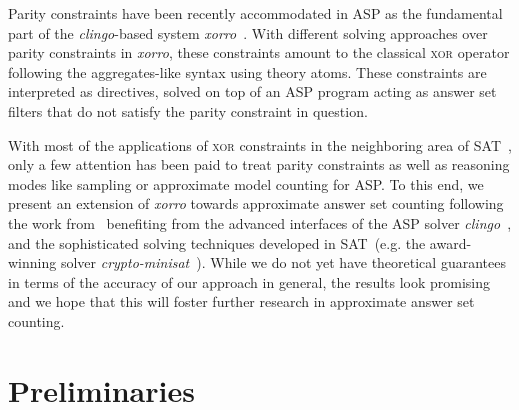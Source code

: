 \documentclass{svproc}
\newcommand{\XOR}{\textsc{xor}} %
\newcommand{\sysfont}{\textit}
\newcommand{\clingo}{\sysfont{clingo}}
\newcommand{\xorro}{\sysfont{xorro}}
\newcommand{\cryptominisat}{\sysfont{crypto-minisat}}
\begin{document}
Parity constraints have been recently accommodated in ASP
as the fundamental part of the \clingo{}-based system \xorro{}~\cite{DBLP:conf/lpnmr/EverardoJKS19}.
%
With different solving approaches over parity constraints in \xorro{}, these constraints amount to the classical \XOR{} operator following the aggregates-like syntax using theory atoms.
These constraints are interpreted as directives, solved on top of an ASP program acting as answer set filters that do not satisfy the parity constraint in question.
%



%
With most of the applications of \XOR{} constraints in the neighboring area of SAT~\cite{DBLP:journals/corr/abs-1806-02239},
only a few attention has been paid to treat parity constraints as well as reasoning modes like sampling or approximate model counting for ASP. %
%
To this end, we present an extension of \xorro{} towards approximate answer set counting following the work from~\cite{ChakrabortyMV13}
benefiting from the advanced interfaces of the ASP solver \clingo{}~\cite{DBLP:conf/iclp/GebserKKOSW16},
and the sophisticated solving techniques developed in SAT~(e.g. the award-winning solver \cryptominisat~\cite{DBLP:conf/sat/SoosNC09}).
%
While we do not yet have theoretical guarantees in terms of the accuracy of our approach in general,
the results look promising and we hope that this will foster further research in approximate answer set counting.
%

\section{Preliminaries}
\end{document}
